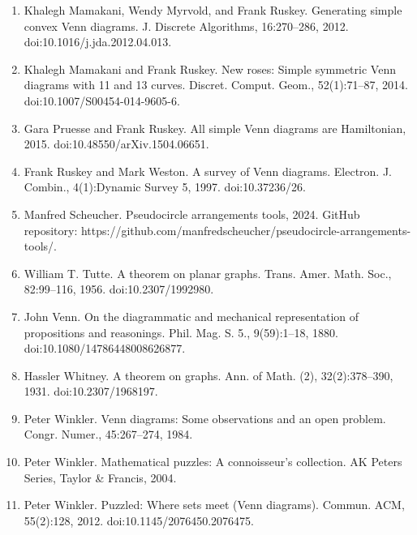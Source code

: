 \documentclass[10pt,a4paper]{article}
\begin{document}
\begin{enumerate}
\item[]  [12]  Khalegh Mamakani, Wendy Myrvold, and Frank Ruskey.  Generating simple convex Venn diagrams.  J. Discrete Algorithms, 16:270–286, 2012.  doi:10.1016/j.jda.2012.04.013.  
\item[]  [13]  Khalegh Mamakani and Frank Ruskey.  New roses: Simple symmetric Venn diagrams with 11 and 13 curves.  Discret. Comput. Geom., 52(1):71–87, 2014.  doi:10.1007/S00454-014-9605-6.  
\item[]  [14]  Gara Pruesse and Frank Ruskey.  All simple Venn diagrams are Hamiltonian, 2015.  doi:10.48550/arXiv.1504.06651.  
\item[]  [15]  Frank Ruskey and Mark Weston.  A survey of Venn diagrams.  Electron. J. Combin., 4(1):Dynamic Survey 5, 1997.  doi:10.37236/26.  
\item[]  [16]  Manfred Scheucher.  Pseudocircle arrangements tools, 2024.  GitHub repository: https://github.com/manfredscheucher/pseudocircle-arrangements-tools/.  
\item[]  [17]  William T. Tutte.  A theorem on planar graphs.  Trans. Amer. Math. Soc., 82:99–116, 1956.  doi:10.2307/1992980.  
\item[]  [18]  John Venn.  On the diagrammatic and mechanical representation of propositions and reasonings.  Phil. Mag. S. 5., 9(59):1–18, 1880.  doi:10.1080/14786448008626877.  
\item[]  [19]  Hassler Whitney.  A theorem on graphs.  Ann. of Math. (2), 32(2):378–390, 1931.  doi:10.2307/1968197.  
\item[]  [20]  Peter Winkler.  Venn diagrams: Some observations and an open problem.  Congr. Numer., 45:267–274, 1984.  
\item[]  [21]  Peter Winkler.  Mathematical puzzles: A connoisseur’s collection.  AK Peters Series, Taylor \& Francis, 2004.  
\item[]  [22]  Peter Winkler.  Puzzled: Where sets meet (Venn diagrams).  Commun. ACM, 55(2):128, 2012.  doi:10.1145/2076450.2076475.  
\end{enumerate}
\end{document}
